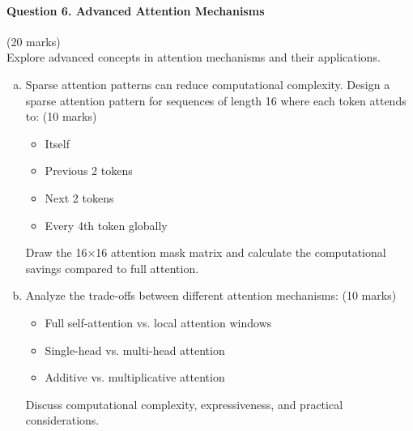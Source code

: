 \documentclass[12pt]{article}
\newcommand{\shortanswer}{\vspace{2cm}}          %
\newcommand{\mediumanswer}{\vspace{3cm}}         %
\begin{document}
\newpage
\paragraph{Question 6. Advanced Attention Mechanisms}\hfill (20 marks)\\
Explore advanced concepts in attention mechanisms and their applications.

\begin{enumerate}[(a)]
    \item Sparse attention patterns can reduce computational complexity. Design a sparse attention pattern for sequences of length 16 where each token attends to: \hfill (10 marks)
    \begin{itemize}
        \item Itself
        \item Previous 2 tokens
        \item Next 2 tokens  
        \item Every 4th token globally
    \end{itemize}
    
    Draw the 16×16 attention mask matrix and calculate the computational savings compared to full attention.
    
    \begin{center}
    \end{center}
    
    \shortanswer
    
    \item Analyze the trade-offs between different attention mechanisms: \hfill (10 marks)
    \begin{itemize}
        \item Full self-attention vs. local attention windows
        \item Single-head vs. multi-head attention
        \item Additive vs. multiplicative attention
    \end{itemize}
    Discuss computational complexity, expressiveness, and practical considerations.
    
    \mediumanswer
\end{enumerate}
\end{document}
